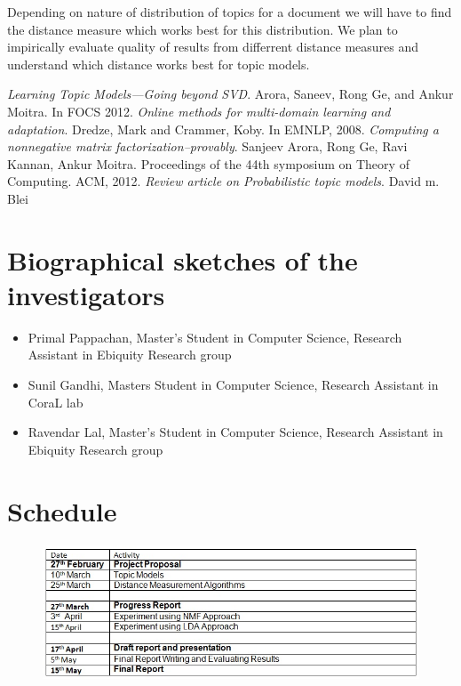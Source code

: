 \documentclass[a4paper,11pt]{article}
\begin{document}
Depending on nature of distribution of topics for a document we will have to find the distance measure which works best for this distribution. We plan to impirically evaluate quality of results from differrent distance measures and understand which distance works best for topic models.


\begin{thebibliography}{99}
 \textit{Learning Topic Models---Going beyond SVD}. Arora, Saneev, Rong Ge, and Ankur Moitra. In FOCS 2012.
 \textit{Online methods for multi-domain learning and adaptation}. Dredze, Mark and Crammer, Koby. In
EMNLP, 2008.
 \textit{Computing a nonnegative matrix factorization--provably}. Sanjeev Arora, Rong Ge, Ravi Kannan, Ankur Moitra. Proceedings of the 44th symposium on Theory of Computing. ACM, 2012.  
 \textit{Review article on Probabilistic topic models}. David m. Blei  
\end{thebibliography}

\section{Biographical sketches of the investigators}

\begin{itemize}
\item Primal Pappachan, Master's Student in Computer Science, Research Assistant in Ebiquity Research group
\item Sunil Gandhi, Masters Student in Computer Science, Research Assistant in CoraL lab
\item Ravendar Lal, Master's Student in Computer Science, Research Assistant in Ebiquity Research group
\end{itemize}


\section{Schedule}
\begin{figure}[h]
\includegraphics[scale=0.75]{schedule.jpg}
\end{figure}
\end{document}

